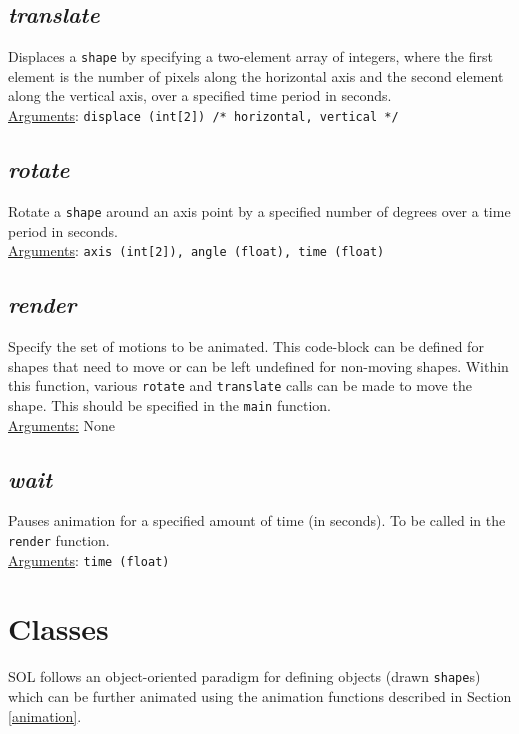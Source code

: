     \subsection{\textit{translate}}
    Displaces a \texttt{shape} by specifying a two-element array of integers, where the first element is the number of pixels along the horizontal axis and the second element along the vertical axis, over a specified time period in seconds.\\
    \underline{Arguments}: \texttt{displace (int[2]) /* horizontal, vertical */}

    \subsection{\textit{rotate}}
    Rotate a \texttt{shape} around an axis point by a specified number of degrees over a time period in seconds.\\
    \underline{Arguments}: \texttt{axis (int[2]), angle (float), time (float)}

    \subsection{\textit{render}}
    Specify the set of motions to be animated. This code-block can be defined for shapes that need to move or can be left undefined for non-moving shapes. Within this function, various \texttt{rotate} and \texttt{translate} calls can be made to move the shape. This should be specified in the \texttt{main} function.\\
    \underline{Arguments:} None

    \subsection{\textit{wait}}
    Pauses animation for a specified amount of time (in seconds). To be called in the \texttt{render} function.\\
    \underline{Arguments}: \texttt{time (float)}


\section{Classes}
SOL follows an object-oriented paradigm for defining objects (drawn \texttt{shape}s) which can be further animated using the animation functions described in Section \ref{animation}.

